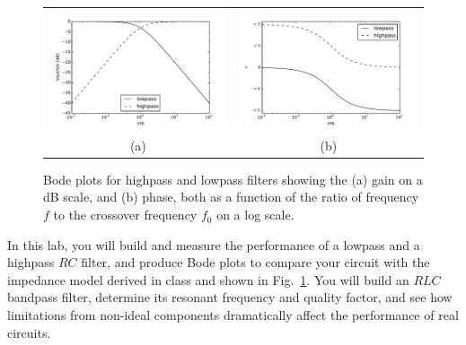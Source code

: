 \begin{figure}[htbp]
\begin{center}
\begin{tabular}{cc}
\includegraphics[height=0.22\textheight]{figs/labs/filters/bode.pdf}
&
\includegraphics[height=0.22\textheight]{figs/labs/filters/phase.pdf} \\
(a) & (b) \\
\end{tabular}
\end{center}
\caption{\label{fig:bode} Bode plots for highpass and lowpass filters showing the (a) gain on a dB scale, and (b) phase, both as a function of the ratio of frequency $f$ to the crossover frequency $f_0$ on a log scale.}
\end{figure}

In this lab, you will build and measure the performance of a lowpass and a highpass $RC$ filter, and produce Bode plots to compare your circuit with the impedance model derived in class and shown in Fig.~\ref{fig:bode}.  You will build an $RLC$ bandpass filter, determine its resonant frequency and quality factor, and see how limitations from non-ideal components dramatically affect the performance of real circuits.

